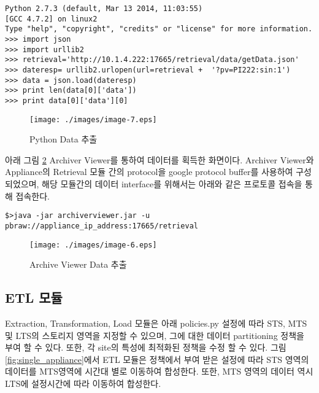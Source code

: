 \documentclass[11pt
  , a4paper
  , article
  , oneside
]{memoir}
\begin{document}
\begin{lstlisting}[style=termstyle]
Python 2.7.3 (default, Mar 13 2014, 11:03:55) 
[GCC 4.7.2] on linux2
Type "help", "copyright", "credits" or "license" for more information.
>>> import json
>>> import urllib2
>>> retrieval='http://10.1.4.222:17665/retrieval/data/getData.json'
>>> dateresp= urllib2.urlopen(url=retrieval +  '?pv=PI222:sin:1')
>>> data = json.load(dateresp)
>>> print len(data[0]['data'])
>>> print data[0]['data'][0]
\end{lstlisting}

\begin{figure}[h!]
	\centering
	\texttt{[image: ./images/image-7.eps]}
	\caption{Python Data 추출}
	\label{fig:python_ext} 
\end{figure}


아래 그림 \ref{fig:viewer} Archiver Viewer를 통하여 데이터를 획득한 화면이다. Archiver Viewer와 Appliance의 Retrieval 모듈 간의 protocol을 google protocol buffer를 사용하여 구성 되었으며, 해당 모듈간의 데이터 interface를 위해서는 아래와 같은 프로토콜 접속을 통해 접속한다.
\begin{lstlisting}[style=termstyle]
$>java -jar archiverviewer.jar -u pbraw://appliance_ip_address:17665/retrieval
\end{lstlisting}

\begin{figure}[h!]
	\centering
	\texttt{[image: ./images/image-6.eps]}
	\caption{Archive Viewer Data 추출}
	\label{fig:viewer} 
\end{figure}

\subsection*{ETL 모듈}
Extraction, Transformation, Load 모듈은 아래 policies.py 설정에 따라 STS, MTS 및 LTS의 스토리지 영역을 지정할 수 있으며, 그에 대한 데이터 partitioning 정책을 부여 할 수 있다. 또한, 각 site의 특성에 최적화된 정책을 수정 할 수 있다. 그림 \ref{fig:single_appliance}에서 ETL 모듈은 정책에서 부여 받은 설정에 따라 STS 영역의 데이터를 MTS영역에 시간대 별로 이동하여 합성한다. 또한, MTS 영역의 데이터 역시 LTS에 설정시간에 따라 이동하여 합성한다.
\end{document}
